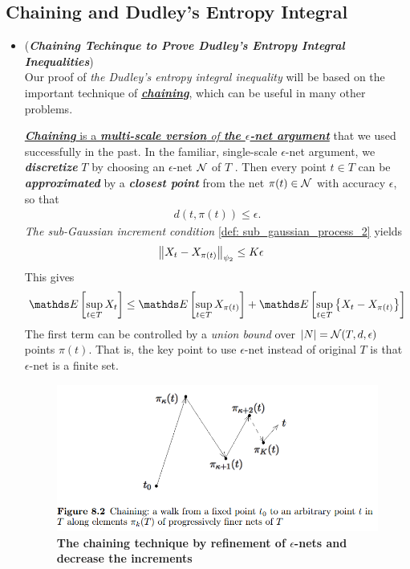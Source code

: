 \documentclass[11pt]{article}
\begin{document}
\subsection{Chaining and Dudley's Entropy Integral}
\begin{itemize}
\item \begin{remark}(\textbf{\emph{Chaining Techinque to Prove Dudley's Entropy Integral Inequalities}}) \citep{vershynin2018high}\\
Our proof of \emph{the Dudley's entropy integral inequality} will be based on the important technique of \underline{\emph{\textbf{chaining}}}, which can be useful in many other problems. 

\underline{\emph{\textbf{Chaining}} is a \emph{\textbf{multi-scale version} of \textbf{the $\epsilon$-net argument}}} that we used successfully in the past. In the familiar, single-scale $\epsilon$-net argument, we \emph{\textbf{discretize}} $T$ by choosing an $\epsilon$-net ${\mathcal N}$ of $T$ . Then every point $t \in T$ can be \emph{\textbf{approximated}} by a \emph{\textbf{closest point}} from the net $\pi(t) \in {\mathcal N}$ with accuracy $\epsilon$, so that 
\begin{align*}
d(t, \pi(t)) \le \epsilon. 
\end{align*} \emph{The sub-Gaussian increment condition} \eqref{def: sub_gaussian_process_2}  yields
\begin{align}
\left\|X_t - X_{\pi(t)}\right\|_{\psi_2} &\le K \epsilon  \label{arg: chaining_argument_sub_gaussian}
\end{align}
This gives
\begin{align*}
\E{}{\sup_{t \in T} X_t} \le   \E{}{\sup_{t\in T}X_{\pi(t)}} +  \E{}{\sup_{t \in T}\set{X_t - X_{\pi(t)}}}
\end{align*}
The first term can be controlled by a \emph{union bound} over $\left\lvert N \right\rvert = {\mathcal N}(T, d, \epsilon)$ points $\pi(t)$. That is, the key point to use $\epsilon$-net instead of original $T$ is that $\epsilon$-net is a finite set. 


\begin{figure}
\begin{minipage}[t]{1\linewidth}
  \centering
  \centerline{\includegraphics[scale = 0.4]{chaining.png}}
\end{minipage}
\caption{\footnotesize{\textbf{The chaining technique by refinement of $\epsilon$-nets and decrease the increments   \citep{vershynin2018high}}}}
\label{fig: chaining}
\end{figure}


\end{remark}
\end{itemize}
\end{document}
